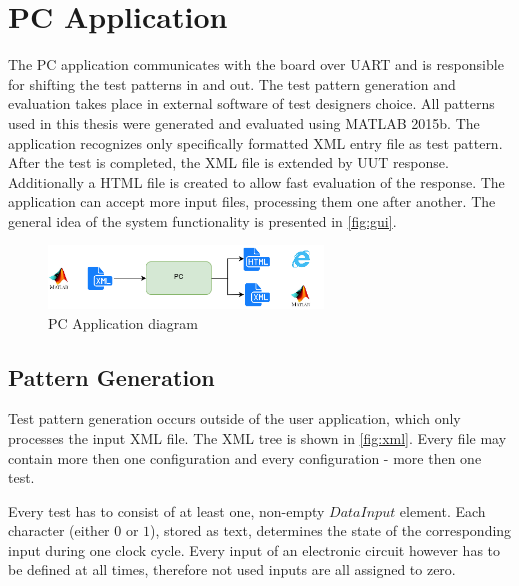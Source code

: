 \section{PC Application}

The PC application communicates with the board over UART and is responsible for shifting the test patterns in and out. The test pattern generation and evaluation takes place in external software of test designers choice. All patterns used in this thesis were generated and evaluated using MATLAB 2015b. The application recognizes only specifically formatted XML entry file as test pattern. After the test is completed, the XML file is extended by UUT response. Additionally a HTML file is created to allow fast evaluation of the response. The application can accept more input files, processing them one after another. The general idea of the system functionality is presented in \autoref{fig:gui}.

\begin{figure}[h]
\centering
\includegraphics[width=0.65\textwidth]{figures/PC.png}
\caption{PC Application diagram}
\label{fig:gui}
\end{figure}

\subsection{Pattern Generation}
Test pattern generation occurs outside of the user application, which only processes the input XML file. The XML tree is shown in \autoref{fig:xml}. Every file may contain more then one configuration and every configuration - more then one test.

Every test has to consist of at least one, non-empty $DataInput$ element. Each character (either $0$ or $1$), stored as text, determines the state of the corresponding input during one clock cycle. Every input of an electronic circuit however has to be defined at all times, therefore not used inputs are all assigned to zero.


